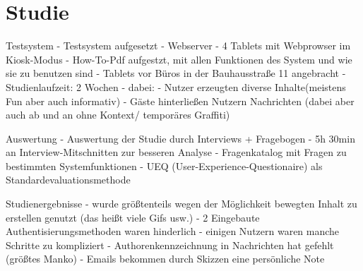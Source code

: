 \documentclass[11pt]{beamer}
\begin{document}
\section{Studie}
\begin{frame}{Testsystem}
  - Testsystem aufgesetzt
    - Webserver
    - 4 Tablets mit Webprowser im Kiosk-Modus
  - How-To-Pdf aufgestzt, mit allen Funktionen des System und wie sie zu benutzen sind
  - Tablets vor Büros in der Bauhausstraße 11 angebracht
  - Studienlaufzeit: 2 Wochen
    - dabei:
      - Nutzer erzeugten diverse Inhalte(meistens Fun aber auch informativ)
      - Gäste hinterließen Nutzern Nachrichten (dabei aber auch ab und an ohne Kontext/ temporäres Graffiti)
\end{frame}
\begin{frame}{Auswertung}
  - Auswertung der Studie durch Interviews + Fragebogen
    - 5h 30min an Interview-Mitschnitten zur besseren Analyse
    - Fragenkatalog mit Fragen zu bestimmten Systemfunktionen
    - UEQ (User-Experience-Questionaire) als Standardevaluationsmethode
\end{frame}
\begin{frame}{Studienergebnisse}
    - wurde größtenteils wegen der Möglichkeit bewegten Inhalt zu erstellen genutzt (das heißt viele Gifs usw.)
    - 2 Eingebaute Authentisierungsmethoden waren hinderlich
    - einigen Nutzern waren manche Schritte zu kompliziert
    - Authorenkennzeichnung in Nachrichten hat gefehlt (größtes Manko)
    - Emails bekommen durch Skizzen eine persönliche Note
\end{frame}
\end{document}
